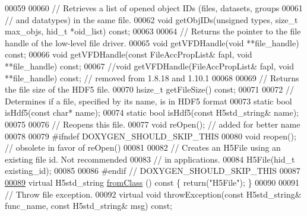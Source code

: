 \begin{DoxyCode}
00059 
00060         \textcolor{comment}{// Retrieves a list of opened object IDs (files, datasets, groups}
00061         \textcolor{comment}{// and datatypes) in the same file.}
00062         \textcolor{keywordtype}{void} getObjIDs(\textcolor{keywordtype}{unsigned} types, \textcolor{keywordtype}{size\_t} max\_objs, hid\_t *oid\_list) \textcolor{keyword}{const};
00063 
00064         \textcolor{comment}{// Returns the pointer to the file handle of the low-level file driver.}
00065         \textcolor{keywordtype}{void} getVFDHandle(\textcolor{keywordtype}{void} **file\_handle) \textcolor{keyword}{const};
00066         \textcolor{keywordtype}{void} getVFDHandle(\textcolor{keyword}{const} FileAccPropList& fapl, \textcolor{keywordtype}{void} **file\_handle) \textcolor{keyword}{const};
00067         \textcolor{comment}{//void getVFDHandle(FileAccPropList& fapl, void **file\_handle) const; // removed from 1.8.18 and
       1.10.1}
00068 
00069         \textcolor{comment}{// Returns the file size of the HDF5 file.}
00070         hsize\_t getFileSize() \textcolor{keyword}{const};
00071 
00072         \textcolor{comment}{// Determines if a file, specified by its name, is in HDF5 format}
00073         \textcolor{keyword}{static} \textcolor{keywordtype}{bool} isHdf5(\textcolor{keyword}{const} \textcolor{keywordtype}{char}* name);
00074         \textcolor{keyword}{static} \textcolor{keywordtype}{bool} isHdf5(\textcolor{keyword}{const} H5std\_string& name);
00075 
00076         \textcolor{comment}{// Reopens this file.}
00077         \textcolor{keywordtype}{void} reOpen();  \textcolor{comment}{// added for better name}
00078 
00079 \textcolor{preprocessor}{#ifndef DOXYGEN\_SHOULD\_SKIP\_THIS}
00080         \textcolor{keywordtype}{void} reopen();  \textcolor{comment}{// obsolete in favor of reOpen()}
00081 
00082         \textcolor{comment}{// Creates an H5File using an existing file id.  Not recommended}
00083         \textcolor{comment}{// in applications.}
00084         H5File(hid\_t existing\_id);
00085 
00086 \textcolor{preprocessor}{#endif // DOXYGEN\_SHOULD\_SKIP\_THIS}
00087 
\hyperlink{class_h5_1_1_h5_file_ae3456c7a33bc2bcf0cdd782ad2641fff}{00089}         \textcolor{keyword}{virtual} H5std\_string \hyperlink{class_h5_1_1_h5_file_ae3456c7a33bc2bcf0cdd782ad2641fff}{fromClass} ()\textcolor{keyword}{ const }\{ \textcolor{keywordflow}{return}(\textcolor{stringliteral}{"H5File"}); \}
00090 
00091         \textcolor{comment}{// Throw file exception.}
00092         \textcolor{keyword}{virtual} \textcolor{keywordtype}{void} throwException(\textcolor{keyword}{const} H5std\_string& func\_name, \textcolor{keyword}{const} H5std\_string& msg) \textcolor{keyword}{const};

\end{DoxyCode}
